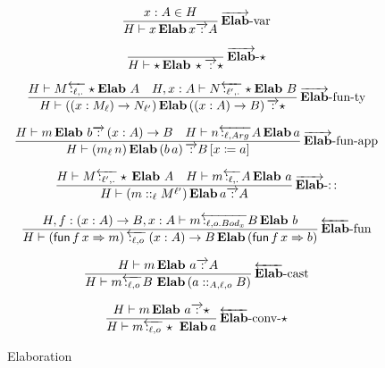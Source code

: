 \begin{figure}
\[
\frac{
  x:A\in H
}{
  H\vdash x\,\textbf{Elab}\,x\overrightarrow{\,:\,}A
}
\operatorname{\overrightarrow{\textbf{Elab}}-var}
\]

\[
\frac{\,}{H\vdash\star\,\textbf{Elab}\,\star\overrightarrow{\,:\,}\star}
\operatorname{\overrightarrow{\textbf{Elab}}-\star}
\]

\[
\frac{
  H\vdash M\overleftarrow{\,:_{\ell,.}\,}\star\textbf{Elab}\ A\quad H,x:A\vdash N\overleftarrow{\,:_{\ell',.}\,}\star\textbf{Elab}\ B
}{
  H\vdash\left(\left(x:M_{\ell}\right)\rightarrow N_{\ell'}\right)\textbf{Elab}\left(\left(x:A\right)\rightarrow B\right)\overrightarrow{\,:\,}\star
}
\operatorname{\overrightarrow{\textbf{Elab}}-fun-ty}
\]

\[
\frac{H\vdash m\,\textbf{Elab}\ b\overrightarrow{\,:\,}\left(x:A\right)\rightarrow B\quad H\vdash n\overleftarrow{\,:_{\ell,Arg}\,}A\,\textbf{Elab}\,a}{H\vdash\left(m_{\ell}\,n\right)\textbf{Elab}\left(b\,a\right)\overrightarrow{\,:\,}B\left[x\coloneqq a\right]}\rulename{\overrightarrow{\textbf{Elab}}-fun-app}
\]

\[
\frac{H\vdash M\overleftarrow{\,:_{\ell',.}\,}\star\,\textbf{Elab}\ A\quad H\vdash m\overleftarrow{\,:_{\ell,.}\,}A\,\textbf{Elab}\ a}{H\vdash\left(m::_{\ell}M^{\ell'}\right)\textbf{Elab}\,a\overrightarrow{\,:\,}A}
\rulename{\overrightarrow{\textbf{Elab}}-::}
\]

\[
\frac{H,f:\left(x:A\right)\rightarrow B,x:A\vdash m\overleftarrow{\,:_{\ell,o.Bod_x}\,}B\,\textbf{Elab}\ b}{H\vdash\left(\mathsf{fun}\,f\,x\Rightarrow m\right)\overleftarrow{\,:_{\ell,o}\,}\left(x:A\right)\rightarrow B\,\textbf{Elab}\left(\mathsf{fun}\,f\,x\Rightarrow b\right)}\rulename{\overleftarrow{\textbf{Elab}}-fun}
\]

\[
\frac{H\vdash m\,\textbf{Elab}\ a\overrightarrow{\,:\,}A}{H\vdash m\overleftarrow{\,:_{\ell,o}\,}B\ \textbf{Elab}\left(a::_{A,\ell,o}B\right)}\rulename{\overleftarrow{\textbf{Elab}}-cast}
\]

\[
\frac{H\vdash m\,\textbf{Elab}\ a\overrightarrow{\,:\,}\star}{H\vdash m\overleftarrow{\,:_{\ell,o}\,}\star\ \textbf{Elab}\,a}
\rulename{\overleftarrow{\textbf{Elab}}-conv-\star}
\]


\caption{Elaboration}
\label{fig:elaboration}
\end{figure}

